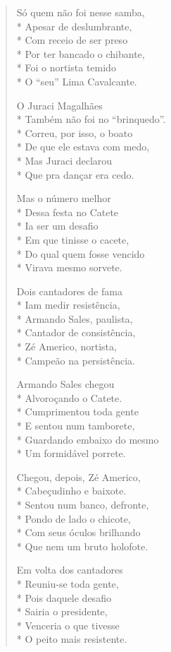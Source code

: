 \begin{verse}
Só quem não foi nesse samba,\\*
Apesar de deslumbrante,\\*
Com receio de ser preso\\*
Por ter bancado o chibante,\\*
Foi o nortista temido\\*
O “seu” Lima Cavalcante.

O Juraci Magalhães\\*
Também não foi no “brinquedo”.\\*
Correu, por isso, o boato\\*
De que ele estava com medo,\\*
Mas Juraci declarou\\*
Que pra dançar era cedo.

Mas o número melhor\\*
Dessa festa no Catete\\*
Ia ser um desafio\\*
Em que tinisse o cacete,\\*
Do qual quem fosse vencido\\*
Virava mesmo sorvete.

Dois cantadores de fama\\*
Iam medir resistência,\\*
Armando Sales, paulista,\\*
Cantador de consistência,\\*
Zé Americo, nortista,\\*
Campeão na persistência.

Armando Sales chegou\\*
Alvoroçando o Catete.\\*
Cumprimentou toda gente\\*
E sentou num tamborete,\\*
Guardando embaixo do mesmo\\*
Um formidável porrete.

Chegou, depois, Zé Americo,\\*
Cabeçudinho e baixote.\\*
Sentou num banco, defronte,\\*
Pondo de lado o chicote,\\*
Com seus óculos brilhando\\*
Que nem um bruto holofote.

Em volta dos cantadores\\*
Reuniu-se toda gente,\\*
Pois daquele desafio\\*
Sairia o presidente,\\*
Venceria o que tivesse\\*
O peito mais resistente.


\end{verse}
